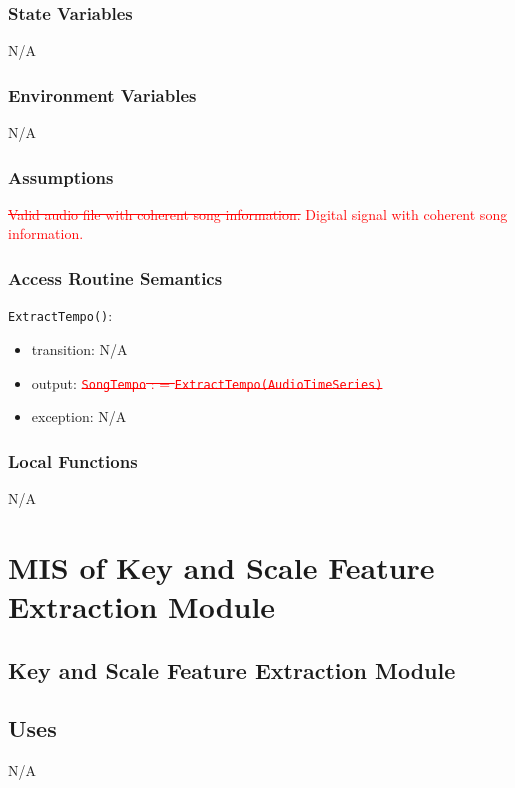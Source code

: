 \documentclass[12pt, titlepage]{article}
\begin{document}
\subsubsection{State Variables}
N/A

\subsubsection{Environment Variables}
N/A

\subsubsection{Assumptions}
\textcolor{red}{\st{Valid audio file with coherent song information.}} \textcolor{red}{Digital signal with coherent song information.}

\subsubsection{Access Routine Semantics}

\noindent \texttt{ExtractTempo()}:
\begin{itemize}
\item transition: N/A
\item output: \textcolor{red}{\st{\texttt{Song\textunderscore Tempo} : = \texttt{ExtractTempo(Audio\textunderscore Time\textunderscore Series)}}} 
\item exception: N/A
\end{itemize}

\subsubsection{Local Functions}
N/A



\section{MIS of Key and Scale Feature Extraction Module} 

\subsection{Key and Scale Feature Extraction Module}

\subsection{Uses}
N/A
\end{document}
